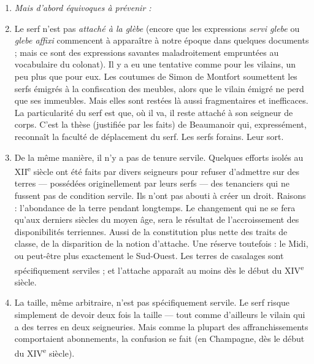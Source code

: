 \documentclass[french,twoside]{book} %
\newlength{\listmod}
\newcommand{\listhead}[1]{\hspace{-1\listmod}\emph{#1}}
\begin{document}
\begin{enumerate}[itemsep=0pt,]
\item[]\listhead{Mais d’abord équivoques à prévenir :}
\item Le serf n’est pas \emph{attaché à la glèbe} (encore que les expressions \emph{servi glebe} ou \emph{glebe affixi} commencent à apparaître à notre époque dans quelques documents ; mais ce sont des expressions savantes maladroitement empruntées au vocabulaire du colonat). Il y a eu une tentative comme pour les vilains, un peu plus que pour eux. Les coutumes de Simon de Montfort soumettent les serfs émigrés à la confiscation des meubles, alors que le vilain émigré ne perd que ses immeubles. Mais elles sont restées là aussi fragmentaires et inefficaces. La particularité du serf est que, où il va, il reste attaché à son seigneur de corps. C’est la thèse (justifiée par les faits) de Beaumanoir qui, expressément, reconnaît la faculté de déplacement du serf. Les serfs forains. Leur sort.
\item De la même manière, il n’y a pas de tenure servile. Quelques efforts isolés au XII\textsuperscript{e} siècle ont été faits par divers seigneurs pour refuser d’admettre sur des terres — possédées originellement par leurs serfs — des tenanciers qui ne fussent pas de condition servile. Ils n’ont pas abouti à créer un droit. Raisons : l’abondance de la terre pendant longtemps. Le changement qui ne se fera qu’aux derniers siècles du moyen âge, sera le résultat de l’accroissement des disponibilités terriennes. Aussi de la constitution plus nette des traits de classe, de la disparition de la notion d’attache. Une réserve toutefois : le Midi, ou peut-être plus exactement le Sud-Ouest. Les terres de casalages sont spécifiquement serviles ; et l’attache apparaît au moins dès le début du XIV\textsuperscript{e} siècle.
\item La taille, même arbitraire, n’est pas spécifiquement servile. Le serf risque simplement de devoir deux fois la taille — tout comme d’ailleurs le vilain qui a des terres en deux seigneuries. Mais comme la plupart des affranchissements comportaient abonnements, la confusion se fait (en Champagne, dès le début du XIV\textsuperscript{e} siècle).

\end{enumerate} 
\label{p60}
\end{document}
